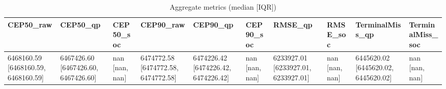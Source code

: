 \begin{table}[t]
\centering
\begin{tabular}{llllllllll}
\toprule
CEP50_raw & CEP50_qp & CEP50_soc & CEP90_raw & CEP90_qp & CEP90_soc & RMSE_qp & RMSE_soc & TerminalMiss_qp & TerminalMiss_soc \\
\midrule
6468160.59 [6468160.59, 6468160.59] & 6467426.60 [6467426.60, 6467426.60] & nan [nan, nan] & 6474772.58 [6474772.58, 6474772.58] & 6474226.42 [6474226.42, 6474226.42] & nan [nan, nan] & 6233927.01 [6233927.01, 6233927.01] & nan [nan, nan] & 6445620.02 [6445620.02, 6445620.02] & nan [nan, nan] \\
\bottomrule
\end{tabular}
\caption{Aggregate metrics (median [IQR])}
\label{tab:aggregate}
\end{table}

